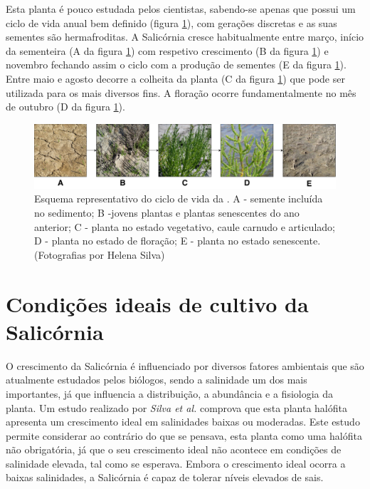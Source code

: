 Esta planta é pouco estudada pelos cientistas\cite{Figueroa1987}, sabendo-se apenas que possui um ciclo de vida anual bem definido (figura \ref{ciclodevida}), com gerações discretas e as suas sementes são hermafroditas\cite{Silva2007}. A Salicórnia cresce habitualmente entre março, início da sementeira (A da figura \ref{ciclodevida}) com respetivo crescimento (B da figura \ref{ciclodevida}) e novembro fechando assim o ciclo com a produção de sementes (E da figura \ref{ciclodevida}). Entre maio  e agosto decorre a colheita da planta\cite{RaquelPinto} (C da figura \ref{ciclodevida}) que pode ser utilizada para os mais diversos fins. A floração ocorre fundamentalmente no mês de outubro\cite{Figueroa1987} (D da figura \ref{ciclodevida}). 



	
\begin{figure}[!htb]
	\centering
	\includegraphics[width=\linewidth]{img/cap2-sali/ciclo/ciclodevida.pdf}
	\caption[Esquema representativo do ciclo de vida da \sr.]{Esquema representativo do ciclo de vida da \sr. A - semente incluída no sedimento; B -jovens plantas e plantas senescentes do ano anterior; C - planta no estado vegetativo, caule carnudo e articulado; D - planta no estado de floração; E - planta no estado senescente. (Fotografias por Helena Silva)}
	\label{ciclodevida}
\end{figure}



\section{Condições ideais de cultivo da Salicórnia}

O crescimento da Salicórnia é influenciado por diversos fatores ambientais que são atualmente estudados pelos biólogos, sendo a salinidade um dos mais importantes, já que influencia a distribuição, a abundância e a fisiologia da planta. Um estudo realizado por \textit{Silva et al.}\cite{Silva2007} comprova que esta planta halófita apresenta um crescimento ideal em salinidades baixas ou moderadas. Este estudo permite considerar ao contrário do que se pensava, esta planta como uma halófita não obrigatória, já que o seu crescimento ideal não acontece em condições de salinidade elevada, tal como se esperava. Embora o crescimento ideal ocorra a baixas salinidades, a Salicórnia é capaz de tolerar níveis elevados de sais\cite{Rubio-Casal2003}.

